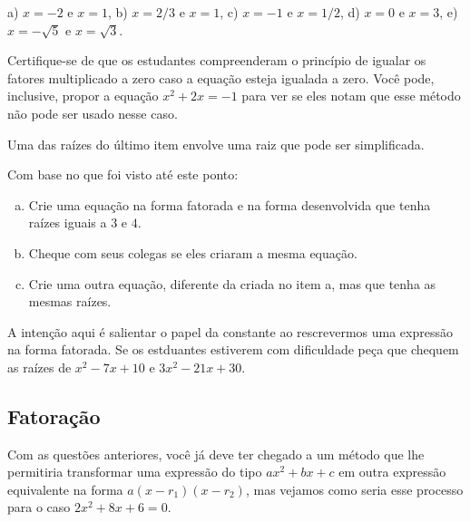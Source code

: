 \documentclass[main.tex]{subfiles}
\begin{document}
\begin{gabarito}
	\begin{gabaritoQuestao}
        a) $x=-2$ e $x=1$, b) $x=2/3$ e $x=1$, c) $x=-1$ e $x=1/2$, d) $x=0$ e $x=3$, e) $x=-\sqrt{5}$ e $x=\sqrt{3}$.
	\end{gabaritoQuestao}
\end{gabarito}

\paraTutores

Certifique-se de que os estudantes compreenderam o princípio de igualar os fatores multiplicado a zero caso a equação esteja igualada a zero. Você pode, inclusive, propor a equação $x^2+2x=-1$ para ver se eles notam que esse método não pode ser usado nesse caso.

Uma das raízes do último item envolve uma raiz que pode ser simplificada.

\paraAmbos

\begin{reflita}
Com base no que foi visto até este ponto:
\begin{enumerate}[a)]
\item Crie uma equação na forma fatorada e na forma desenvolvida que tenha raízes iguais a $3$ e $4$.
\item Cheque com seus colegas se eles criaram a mesma equação.
\item Crie uma outra equação, diferente da criada no item a, mas que tenha as mesmas raízes.
\end{enumerate}
\end{reflita}

\paraTutores

A intenção aqui é salientar o papel da constante ao rescrevermos uma expressão na forma fatorada. Se os estduantes estiverem com dificuldade peça que chequem as raízes de $x^2-7x+10$ e $3x^2-21x+30$.

\paraAmbos

\subsection*{Fatoração}

Com as questões anteriores, você já deve ter chegado a um método que lhe permitiria transformar uma expressão do tipo $ax^2+bx+c$ em outra expressão equivalente na forma $a(x-r_1)(x-r_2)$, mas vejamos como seria esse processo para o caso $2x^2+8x+6=0$.
\end{document}
